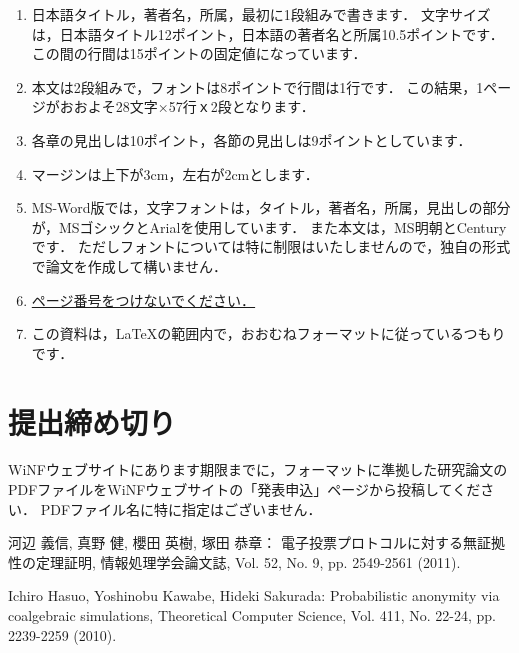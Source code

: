 \documentclass[a4j,8pt,twocolumn]{extarticle}
\begin{document}
\begin{enumerate}
\item 日本語タイトル，著者名，所属，最初に1段組みで書きます．
文字サイズは，日本語タイトル12ポイント，日本語の著者名と所属10.5ポイントです．
この間の行間は15ポイントの固定値になっています．

\item 本文は2段組みで，フォントは8ポイントで行間は1行です．
この結果，1ページがおおよそ28文字×57行ｘ2段となります．

\item 各章の見出しは10ポイント，各節の見出しは9ポイントとしています．

\item マージンは上下が3cm，左右が2cmとします．

\item MS-Word版では，文字フォントは，タイトル，著者名，所属，見出しの部分が，MSゴシックとArialを使用しています．
また本文は，MS明朝とCenturyです．
ただしフォントについては特に制限はいたしませんので，独自の形式で論文を作成して構いません．

\item \underline{ページ番号をつけないでください．}

\item この資料は，\LaTeX の範囲内で，おおむねフォーマットに従っているつもりです．
\end{enumerate}


\section{提出締め切り}

WiNFウェブサイトにあります期限までに，フォーマットに準拠した研究論文のPDFファイルをWiNFウェブサイトの「発表申込」ページから投稿してください．
PDFファイル名に特に指定はございません．


\begin{thebibliography}{9}
河辺 義信, 真野 健, 櫻田 英樹, 塚田 恭章：
電子投票プロトコルに対する無証拠性の定理証明,
情報処理学会論文誌,
Vol. 52, No. 9, pp. 2549-2561 (2011).

Ichiro Hasuo, Yoshinobu Kawabe, Hideki Sakurada:
Probabilistic anonymity via coalgebraic simulations,
Theoretical Computer Science,
Vol. 411, No. 22-24, pp. 2239-2259 (2010).
\end{thebibliography}


\end{document}

